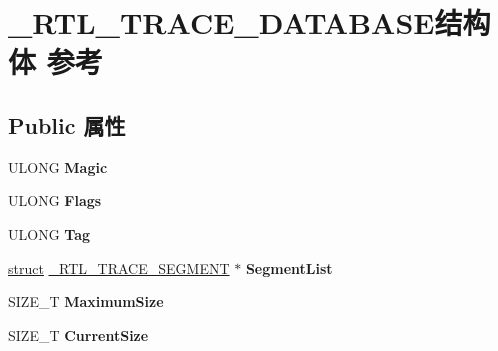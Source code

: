 \hypertarget{struct___r_t_l___t_r_a_c_e___d_a_t_a_b_a_s_e}{}\section{\+\_\+\+R\+T\+L\+\_\+\+T\+R\+A\+C\+E\+\_\+\+D\+A\+T\+A\+B\+A\+S\+E结构体 参考}
\label{struct___r_t_l___t_r_a_c_e___d_a_t_a_b_a_s_e}
\subsection*{Public 属性}
\begin{DoxyCompactItemize}
\item 
\mbox{\label{struct___r_t_l___t_r_a_c_e___d_a_t_a_b_a_s_e_a18cb15443caeffed5fbee5e9b2943138}} 
U\+L\+O\+NG {\bfseries Magic}
\item 
\mbox{\label{struct___r_t_l___t_r_a_c_e___d_a_t_a_b_a_s_e_abb96c9b3263bbf754ae8b8f341157d4e}} 
U\+L\+O\+NG {\bfseries Flags}
\item 
\mbox{\label{struct___r_t_l___t_r_a_c_e___d_a_t_a_b_a_s_e_a78c052fa14039fac863b3d6474587e36}} 
U\+L\+O\+NG {\bfseries Tag}
\item 
\mbox{\label{struct___r_t_l___t_r_a_c_e___d_a_t_a_b_a_s_e_a4277c05c06b52f3cacbc921202b91810}} 
\hyperlink{interfacestruct}{struct} \hyperlink{struct___r_t_l___t_r_a_c_e___s_e_g_m_e_n_t}{\+\_\+\+R\+T\+L\+\_\+\+T\+R\+A\+C\+E\+\_\+\+S\+E\+G\+M\+E\+NT} $\ast$ {\bfseries Segment\+List}
\item 
\mbox{\label{struct___r_t_l___t_r_a_c_e___d_a_t_a_b_a_s_e_af8df32295a843dbdcc08aa38c587c6e5}} 
S\+I\+Z\+E\+\_\+T {\bfseries Maximum\+Size}
\item 
\mbox{\label{struct___r_t_l___t_r_a_c_e___d_a_t_a_b_a_s_e_a3fbda94e5002239ab015ddcb8792433f}} 
S\+I\+Z\+E\+\_\+T {\bfseries Current\+Size}
\item 
\mbox{\label{struct___r_t_l___t_r_a_c_e___d_a_t_a_b_a_s_e_a255eb30aa841c31d13e30ea8af84c8ff}} 

\end{DoxyCompactItemize}
